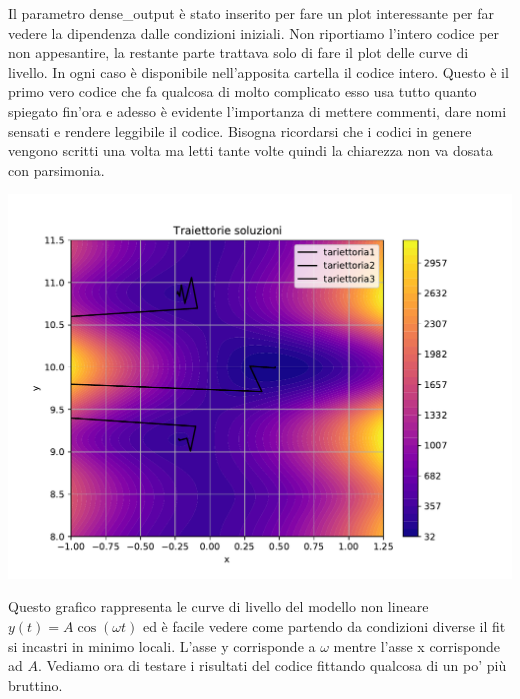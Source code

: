 \documentclass[10pt,a4paper]{article}
\begin{document}
Il parametro dense\_output è stato inserito per fare un plot interessante per far vedere la dipendenza dalle condizioni iniziali.
Non riportiamo l'intero codice per non appesantire, la restante parte trattava solo di fare il plot delle curve di livello. In ogni caso è disponibile nell'apposita cartella il codice intero. Questo è il primo vero codice che fa qualcosa di molto complicato esso usa tutto quanto spiegato fin'ora e adesso è evidente l'importanza di mettere commenti, dare nomi sensati e rendere leggibile il codice. Bisogna ricordarsi che i codici in genere vengono scritti una volta ma letti tante volte quindi la chiarezza non va dosata con parsimonia.

\includegraphics[scale=0.8]{img/traiettorie_fit.pdf}

Questo grafico rappresenta le curve di livello del modello non lineare $y(t) = A \cos( \omega t)$ ed è facile vedere come partendo da condizioni diverse il fit si incastri in minimo locali. L'asse y corrisponde a $\omega$ mentre l'asse x corrisponde ad $A$. Vediamo ora di testare i risultati del codice fittando qualcosa di un po' più bruttino. 
\end{document}
